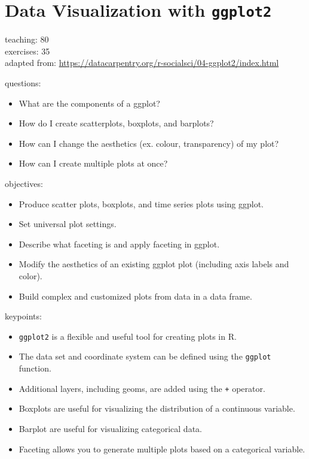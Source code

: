 \documentclass[]{book}
\providecommand{\tightlist}{%
  \setlength{\itemsep}{0pt}\setlength{\parskip}{0pt}}
\begin{document}
\chapter{\texorpdfstring{Data Visualization with
\texttt{ggplot2}}{Data Visualization with ggplot2}}\label{ggplot}

teaching: 80\\
exercises: 35\\
adapted from:
\url{https://datacarpentry.org/r-socialsci/04-ggplot2/index.html}

questions:

\begin{itemize}
\tightlist
\item
  What are the components of a ggplot?\\
\item
  How do I create scatterplots, boxplots, and barplots?\\
\item
  How can I change the aesthetics (ex. colour, transparency) of my
  plot?\\
\item
  How can I create multiple plots at once?
\end{itemize}

objectives:

\begin{itemize}
\tightlist
\item
  Produce scatter plots, boxplots, and time series plots using ggplot.\\
\item
  Set universal plot settings.\\
\item
  Describe what faceting is and apply faceting in ggplot.\\
\item
  Modify the aesthetics of an existing ggplot plot (including axis
  labels and color).\\
\item
  Build complex and customized plots from data in a data frame.
\end{itemize}

keypoints:

\begin{itemize}
\tightlist
\item
  \texttt{ggplot2} is a flexible and useful tool for creating plots in
  R.\\
\item
  The data set and coordinate system can be defined using the
  \texttt{ggplot} function.\\
\item
  Additional layers, including geoms, are added using the \texttt{+}
  operator.\\
\item
  Boxplots are useful for visualizing the distribution of a continuous
  variable.\\
\item
  Barplot are useful for visualizing categorical data.\\
\item
  Faceting allows you to generate multiple plots based on a categorical
  variable.
\end{itemize}
\end{document}
